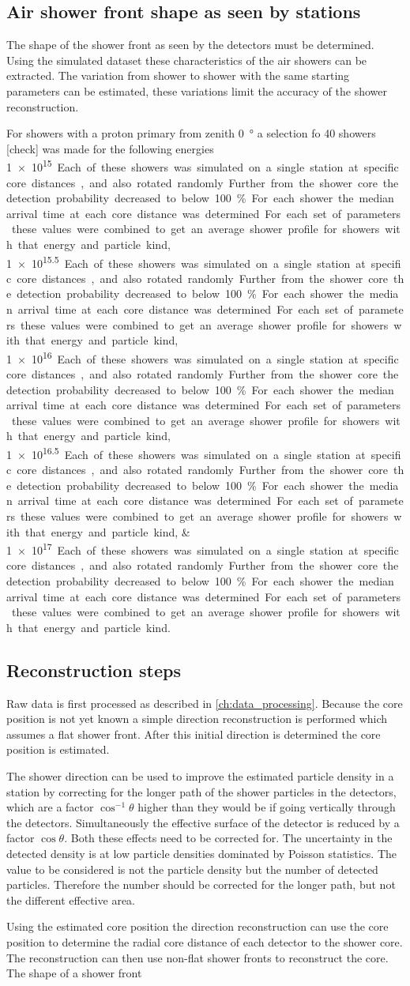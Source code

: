 \subsection{Air shower front shape as seen by stations}

The shape of the shower front as seen by the detectors must be determined. Using the simulated dataset these characteristics of the air showers can be extracted. The variation from shower to shower with the same starting parameters can be estimated, these variations limit the accuracy of the shower reconstruction.

For showers with a proton primary from zenith \SI{0}{\degree} a selection fo 40 showers [check] was made for the following energies \SIlist{1e15;1e15.5;1e16;1e16.5;1e17}. Each of these showers was simulated on a single station at specific core distances, and also rotated randomly. Further from the shower core the detection probability decreased to below \SI{100}{\percent}. For each shower the median arrival time at each core distance was determined. For each set of parameters these values were combined to get an average shower profile for showers with that energy and particle kind.


\subsection{Reconstruction steps}

Raw data is first processed as described in \cref{ch:data_processing}. Because the core position is not yet known a simple direction reconstruction is performed which assumes a flat shower front. After this initial direction is determined the core position is estimated.

The shower direction can be used to improve the estimated particle density in a station by correcting for the longer path of the shower particles in the detectors, which are a factor $\cos^{-1} \theta$ higher than they would be if going vertically through the detectors. Simultaneously the effective surface of the detector is reduced by a factor $\cos \theta$. Both these effects need to be corrected for. The uncertainty in the detected density is at low particle densities dominated by Poisson statistics. The value to be considered is not the particle density but the number of detected particles. Therefore the number should be corrected for the longer path, but not the different effective area.

Using the estimated core position the direction reconstruction can use the core position to determine the radial core distance of each detector to the shower core. The reconstruction can then use non-flat shower fronts to reconstruct the core. The shape of a shower front 